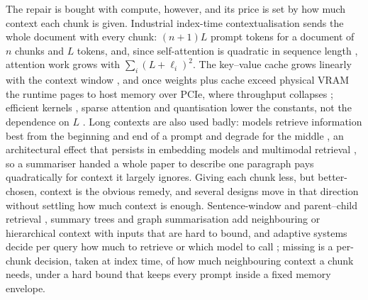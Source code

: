 \documentclass[pdflatex,sn-mathphys-num]{sn-jnl}
\theoremstyle{thmstyleone}%
\theoremstyle{thmstylethree}%
\begin{document}
The repair is bought with compute, however, and its price is set by how much context each chunk is given. Industrial index-time contextualisation sends the whole document with every chunk: $(n+1)L$ prompt tokens for a document of $n$ chunks and $L$ tokens, and, since self-attention is quadratic in sequence length \cite{vaswani2017attention,tay2022efficient,kaplan2020scaling}, attention work grows with $\sum_i (L+\ell_i)^2$. The key--value cache grows linearly with the context window \cite{pope2023efficiently,kwon2023vllm,ainslie2023gqa}, and once weights plus cache exceed physical VRAM the runtime pages to host memory over PCIe, where throughput collapses \cite{sheng2023flexgen}; efficient kernels \cite{dao2022flashattention}, sparse attention \cite{beltagy2020longformer} and quantisation \cite{jacob2018quantization} lower the constants, not the dependence on $L$ \cite{shen2024RAGDesignTradeoffs,zhao2025RAGDesignDecisions,samsi2023words}. Long contexts are also used badly: models retrieve information best from the beginning and end of a prompt and degrade for the middle \cite{liu2023lostmiddlelanguagemodels}, an architectural effect \cite{guo2024serialpositioneffectslarge,menschikov2025earlytokenbiasmodelspecificlanguagespecific,hsieh2024found} that persists in embedding models \cite{lee2025quantifyingpositionalbiasestext} and multimodal retrieval \cite{yao2025spotlighthiddenbiasundermining}, so a summariser handed a whole paper to describe one paragraph pays quadratically for context it largely ignores. Giving each chunk less, but better-chosen, context is the obvious remedy, and several designs move in that direction without settling how much context is enough. Sentence-window and parent--child retrieval \cite{gao2024retrievalaugmentedgenerationlargelanguage, Liu_LlamaIndex_2022}, summary trees \cite{sarthi2024raptorrecursiveabstractiveprocessing} and graph summarisation \cite{edge2024graphrag} add neighbouring or hierarchical context with inputs that are hard to bound, and adaptive systems decide per query how much to retrieve \cite{jeong2024adaptiverag,asai2024selfrag} or which model to call \cite{ong2024routellm,chen2023frugalgpt}; missing is a per-chunk decision, taken at index time, of how much neighbouring context a chunk needs, under a hard bound that keeps every prompt inside a fixed memory envelope.
\end{document}
